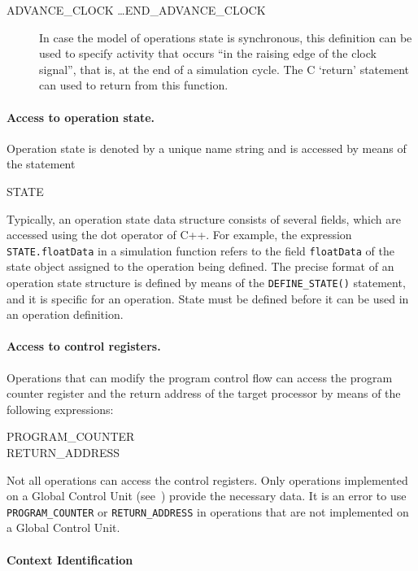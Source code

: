 \documentclass[a4paper,twoside]{tceusermanual}
\begin{document}
\begin{description}
\item[ADVANCE\_CLOCK \ldots END\_ADVANCE\_CLOCK]%
  In case the model of operations state is synchronous, this definition can
  be used to specify activity that occurs ``in the raising edge of the clock
  signal'', that is, at the end of a simulation cycle. The C `return'
  statement can used to return from this function.
\end{description}

\paragraph{Access to operation state.}
Operation state is denoted by a unique name string and is accessed by means
of the statement
\begin{description}
\item[STATE]
\end{description}

Typically, an operation state data structure consists of several fields,
which are accessed using the dot operator of C++.  For example, the
expression \verb#STATE.floatData# in a simulation function refers to the
field \verb#floatData# of the state object assigned to the operation
being defined.  The precise format of an
operation state structure is defined by means of the \verb#DEFINE_STATE()#
statement, and it is specific for an operation. State must be defined before it
can be used in an operation definition.

\paragraph{Access to control registers.}
Operations that can modify the program control flow can access the program
counter register and the return address of the target processor by means of
the following expressions:
\begin{description}
\item[PROGRAM\_COUNTER] %
\item[RETURN\_ADDRESS] %
\end{description}
Not all operations can access the control registers.  Only operations
implemented on a Global Control Unit (see~\cite{ADF-specs}) provide the
necessary data.  It is an error to use \verb#PROGRAM_COUNTER# or
\verb#RETURN_ADDRESS# in operations that are not implemented on a Global
Control Unit.

\paragraph{Context Identification}
\end{document}

